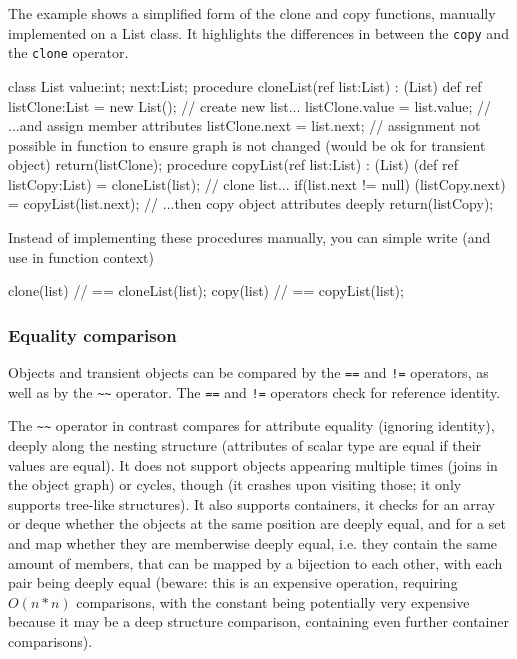 \begin{example}
The example shows a simplified form of the clone and copy functions, manually implemented on a List class.
It highlights the differences in between the \texttt{copy} and the \texttt{clone} operator.
\begin{grgen}
class List {
  value:int;
  next:List;
}
procedure cloneList(ref list:List) : (List)
{
  def ref listClone:List = new List(); // create new list...
  listClone.value = list.value; // ...and assign member attributes
  listClone.next = list.next; // assignment not possible in function to ensure graph is not changed (would be ok for transient object)
  return(listClone);
}
procedure copyList(ref list:List) : (List)
{
  (def ref listCopy:List) = cloneList(list); // clone list...
  if(list.next != null) {
    (listCopy.next) = copyList(list.next); // ...then copy object attributes deeply
  } 
  return(listCopy);
}
\end{grgen}
Instead of implementing these procedures manually, you can simple write (and use in function context)
\begin{grgen}
clone(list) // == cloneList(list);
copy(list) // == copyList(list);
\end{grgen}
\end{example}


\subsubsection{Equality comparison}\label{subsec:objectequality}

Objects and transient objects can be compared by the \texttt{==} and \texttt{!=} operators, as well as by the \texttt{\textasciitilde\textasciitilde} operator.
The \texttt{==} and \texttt{!=} operators check for reference identity.

The \texttt{\textasciitilde\textasciitilde} operator in contrast compares for attribute equality (ignoring identity), deeply along the nesting structure (attributes of scalar type are equal if their values are equal).
It does not support objects appearing multiple times (joins in the object graph) or cycles, though (it crashes upon visiting those; it only supports tree-like structures).
It also supports containers, it checks for an array or deque whether the objects at the same position are deeply equal, and for a set and map whether they are memberwise deeply equal, i.e. they contain the same amount of members, that can be mapped by a bijection to each other, with each pair being deeply equal
(beware: this is an expensive operation, requiring $O(n*n)$ comparisons, with the constant being potentially very expensive because it may be a deep structure comparison, containing even further container comparisons).

